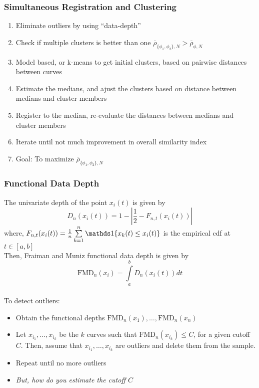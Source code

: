 \documentclass[10pt,dvipsnames,table]{beamer}
\begin{document}
\begin{frame}
\frametitle{Simultaneous Registration and Clustering}
\begin{enumerate}
\item Eliminate outliers by using ``data-depth''
\item Check if multiple clusters is better than one $\bar{\rho}_{\{\phi_1, \phi_2\}, N} > \bar{\rho}_{\phi, N}$
\item Model based, or k-means to get initial clusters, based on pairwise distances between curves
\item Estimate the medians, and ajust the clusters based on distance between medians and cluster members
\item Register to the median, re-evaluate the distances between medians and cluster members
\item Iterate until not much improvement in overall similarity index
\item Goal: To maximize $\bar{\rho}_{\{\phi_1, \phi_2\}, N}$
\end{enumerate}
\end{frame}

\begin{frame}
\frametitle{Functional Data Depth}
The univariate depth of the point $x_i(t)$ is given by
\[ D_n(x_i(t)) = 1 - \left| \frac{1}{2} - F_{n,t} (x_i (t)) \right| \]
where, $F_{n,t} (x_i (t)) = \frac{1}{n}\sum\limits_{k=1}^{n}\Ind\{ x_k(t) \leq x_i(t)\}$ is the empirical cdf at $t \in [a,b]$ \\
Then, Fraiman and Muniz functional data depth is given by
\[ \text{FMD}_n(x_i) = \int\limits_a^b D_n(x_i(t)) dt\] \\
To detect outliers:
\begin{itemize}
\item Obtain the functional depths $\text{FMD}_n(x_1), \dots, \text{FMD}_n(x_n)$
\item Let $x_{i_1}, \dots, x_{i_k}$ be the $k$ curves such that $\text{FMD}_n (x_{i_k}) \leq C$, for a given cutoff $C$. Then, assume that $x_{i_1}, \dots, x_{i_k}$ are outliers and delete them from the sample.
\item Repeat until no more outliers
\item {\emph{But, how do you estimate the cutoff $C$}}
\end{itemize}
\end{frame}
\end{document}
